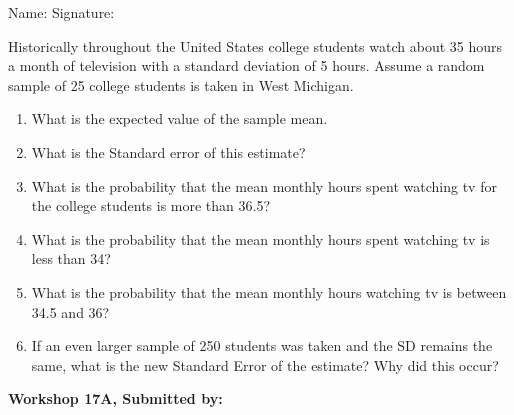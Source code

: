 \documentclass[11pt]{book}\usepackage[]{graphicx}\usepackage[]{color}
\begin{document}
\begin{exercises}
\begin{exercise}
\begin{center}
{{\vspace{4mm}
Name: \underline{\phantom{xxxxxxxxxxxxxxxxxxxxxxxx}} Signature: \underline{\phantom{xxxxxxxxxxxxxxxxxxxxxxxx}}
 }}
\end{center}

Historically throughout the United States college students watch about 35 hours a month of television with a standard deviation of 5 hours. Assume a random sample of 25 college students is taken in West Michigan.

\begin{enumerate}
\item  What is the expected value of the sample mean.
\item  What is the Standard error of this estimate?
\item  What is the probability that the mean monthly hours spent watching tv for the college students is more than 36.5?
\item  What is the probability that the mean monthly hours spent watching tv is less than 34?
\item  What is the probability that the mean monthly hours watching tv is between 34.5 and 36?
\item  If an even larger sample of 250 students was taken and the SD remains the same, what is the new Standard Error of the estimate?  Why did this occur?
\end{enumerate}

\end{exercise}
\begin{solution}  %

\end{solution}


\clearpage

    \begin{exercise}  %

    \begin{center}
\begin{flushleft}\textbf{\large \hfill Workshop 17A, Submitted by: }\end{flushleft}

\end{center}
\end{exercise}
\end{exercises}
\end{document}
